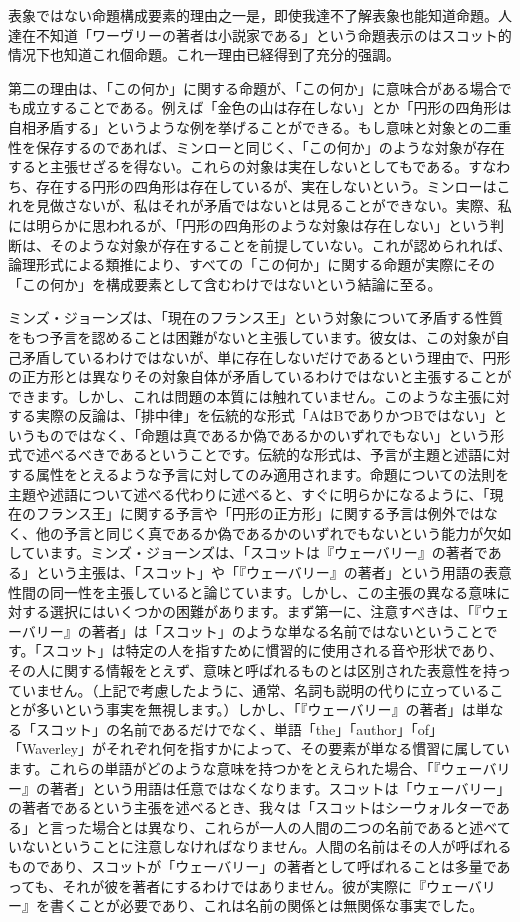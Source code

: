 \documentclass[a4paper,11pt,openany]{ltjsbook}
\begin{document}
表象ではない命題構成要素的理由之一是，即使我達不了解表象也能知道命題。人達在不知道「ワーヴリーの著者は小説家である」という命題表示のはスコット的情况下也知道これ個命題。これ一理由已経得到了充分的强調。

第二の理由は、「この何か」に関する命題が、「この何か」に意味合がある場合でも成立することである。例えば「金色の山は存在しない」とか「円形の四角形は自相矛盾する」というような例を挙げることができる。もし意味と対象との二重性を保存するのであれば、ミンローと同じく、「この何か」のような対象が存在すると主張せざるを得ない。これらの対象は実在しないとしてもである。すなわち、存在する円形の四角形は存在しているが、実在しないという。ミンローはこれを見做さないが、私はそれが矛盾ではないとは見ることができない。実際、私には明らかに思われるが、「円形の四角形のような対象は存在しない」という判断は、そのような対象が存在することを前提していない。これが認められれば、論理形式による類推により、すべての「この何か」に関する命題が実際にその「この何か」を構成要素として含むわけではないという結論に至る。

ミンズ・ジョーンズは、「現在のフランス王」という対象について矛盾する性質をもつ予言を認めることは困難がないと主張しています。彼女は、この対象が自己矛盾しているわけではないが、単に存在しないだけであるという理由で、円形の正方形とは異なりその対象自体が矛盾しているわけではないと主張することができます。しかし、これは問題の本質には触れていません。このような主張に対する実際の反論は、「排中律」を伝統的な形式「AはBでありかつBではない」というものではなく、「命題は真であるか偽であるかのいずれでもない」という形式で述べるべきであるということです。伝統的な形式は、予言が主題と述語に対する属性をとえるような予言に対してのみ適用されます。命題についての法則を主題や述語について述べる代わりに述べると、すぐに明らかになるように、「現在のフランス王」に関する予言や「円形の正方形」に関する予言は例外ではなく、他の予言と同じく真であるか偽であるかのいずれでもないという能力が欠如しています。ミンズ・ジョーンズは、「スコットは『ウェーバリー』の著者である」という主張は、「スコット」や「『ウェーバリー』の著者」という用語の表意性間の同一性を主張していると論じています。しかし、この主張の異なる意味に対する選択にはいくつかの困難があります。まず第一に、注意すべきは、「『ウェーバリー』の著者」は「スコット」のような単なる名前ではないということです。「スコット」は特定の人を指すために慣習的に使用される音や形状であり、その人に関する情報をとえず、意味と呼ばれるものとは区別された表意性を持っていません。（上記で考慮したように、通常、名詞も説明の代りに立っていることが多いという事実を無視します。）しかし、「『ウェーバリー』の著者」は単なる「スコット」の名前であるだけでなく、単語「the」「author」「of」「Waverley」がそれぞれ何を指すかによって、その要素が単なる慣習に属しています。これらの単語がどのような意味を持つかをとえられた場合、「『ウェーバリー』の著者」という用語は任意ではなくなります。スコットは「ウェーバリー」の著者であるという主張を述べるとき、我々は「スコットはシーウォルターである」と言った場合とは異なり、これらが一人の人間の二つの名前であると述べていないということに注意しなければなりません。人間の名前はその人が呼ばれるものであり、スコットが「ウェーバリー」の著者として呼ばれることは多量であっても、それが彼を著者にするわけではありません。彼が実際に『ウェーバリー』を書くことが必要であり、これは名前の関係とは無関係な事実でした。
\end{document}
